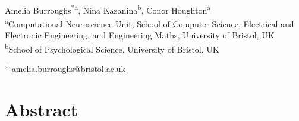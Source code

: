 \documentclass[10pt,letterpaper]{article}
\date{}
\begin{document}
\vspace*{0.2in}

\begin{flushleft}
{\Large
\textbf{} 
}
\newline
\\
Amelia Burroughs\textsuperscript{*a}, %
%
%
Nina Kazanina\textsuperscript{b}, %
%
Conor Houghton\textsuperscript{a}
\\
\bigskip
\textsuperscript{a}Computational Neuroscience Unit, School of Computer Science, Electrical and Electronic Engineering, and Engineering Maths, University of Bristol, UK\\
\textsuperscript{b}School of Psychological Science, University of Bristol, UK
\\
\bigskip

* amelia.burroughs@bristol.ac.uk

\end{flushleft}
\section*{Abstract}


\end{document}

